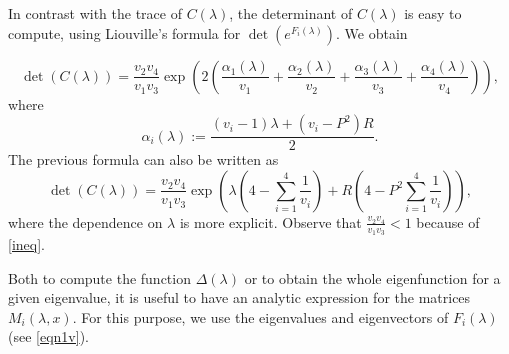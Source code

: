 \documentclass[a4paper]{article}
\numberwithin{equation}{section}
\begin{document}
In contrast with the trace of $C(\lambda)$, the determinant of $C(\lambda)$ is easy to compute, using Liouville's formula for $\det(e^{F_i(\lambda)})$. We obtain

\begin{equation}\label{detC}
\det (C(\lambda))=  \dfrac{v_2v_4}{v_1v_3}\exp\left({2\left(\frac{\alpha_1(\lambda)}{v_1} + \frac{\alpha_2(\lambda)}{v_2} + \frac{\alpha_3(\lambda)}{v_3} + \frac{\alpha_4(\lambda)}{v_4}\right)}\right),
\end{equation}
where
\begin{equation}\label{alpha}
\alpha_i(\lambda) := \frac{(v_i - 1)\lambda + (v_i - P^2)R}{2}.
\end{equation}
The previous formula can also be written as
\begin{equation}\label{eq:detC2}
\det (C(\lambda)) = \dfrac{v_2v_4}{v_1v_3}\exp\left( \lambda \left(4-\sum_{i=1}^4\dfrac{1}{v_i} \right) + R\left( 4-P^2\sum_{i=1}^4\dfrac{1}{v_i}\right)   \right),
\end{equation}
where the dependence on $\lambda$ is more explicit. Observe that $\frac{v_2v_4}{v_1v_3}<1$ because of \eqref{ineq}.

Both to compute the function $\Delta(\lambda)$ or to obtain the whole eigenfunction for a given eigenvalue, it is useful to have an analytic expression for the matrices $M_i(\lambda, x)$. For this purpose, we use the eigenvalues and eigenvectors of $F_i(\lambda)$ (see \eqref{eqn1v}).
\end{document}
